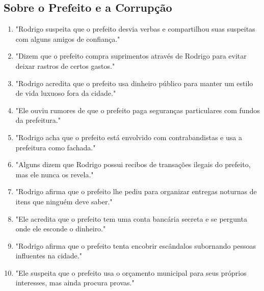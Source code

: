 \subsection*{Sobre o Prefeito e a Corrupção}
\begin{enumerate}
    \item "Rodrigo suspeita que o prefeito desvia verbas e compartilhou suas suspeitas com alguns amigos de confiança."
    \item "Dizem que o prefeito compra suprimentos através de Rodrigo para evitar deixar rastros de certos gastos."
    \item "Rodrigo acredita que o prefeito usa dinheiro público para manter um estilo de vida luxuoso fora da cidade."
    \item "Ele ouviu rumores de que o prefeito paga seguranças particulares com fundos da prefeitura."
    \item "Rodrigo acha que o prefeito está envolvido com contrabandistas e usa a prefeitura como fachada."
    \item "Alguns dizem que Rodrigo possui recibos de transações ilegais do prefeito, mas ele nunca os revela."
    \item "Rodrigo afirma que o prefeito lhe pediu para organizar entregas noturnas de itens que ninguém deve saber."
    \item "Ele acredita que o prefeito tem uma conta bancária secreta e se pergunta onde ele esconde o dinheiro."
    \item "Rodrigo afirma que o prefeito tenta encobrir escândalos subornando pessoas influentes na cidade."
    \item "Ele suspeita que o prefeito usa o orçamento municipal para seus próprios interesses, mas ainda procura provas."
\end{enumerate}

